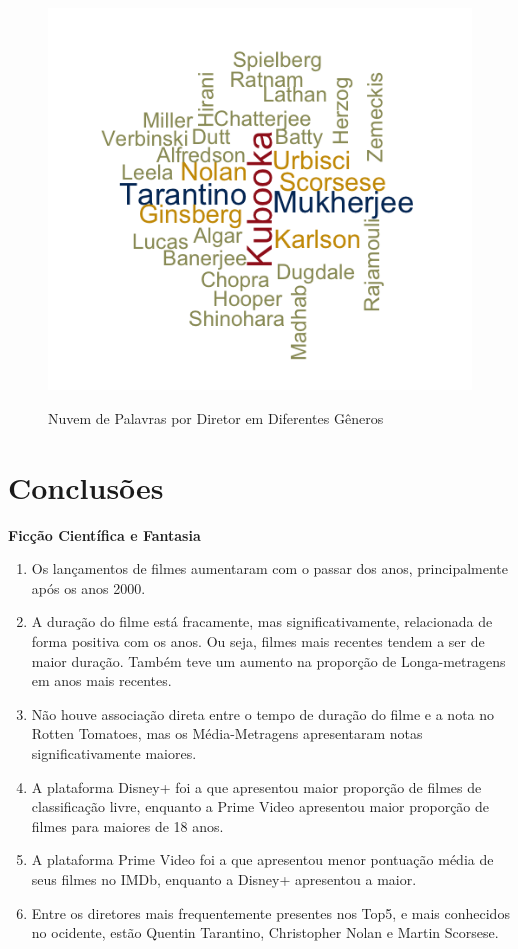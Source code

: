 \documentclass[a4paper, 12pt]{article} %
\begin{document}
\begin{figure}[H]
    \centering
    \caption{Nuvem de Palavras por Diretor em Diferentes Gêneros}
    \includegraphics[scale=1]{Nuvem.png}
    \label{fig:my_label}
\end{figure}

\pagebreak

\section{Conclusões}
\textbf{Ficção Científica e Fantasia}
\begin{enumerate}[topsep=0pt,partopsep=0pt]
    \item Os lançamentos de filmes aumentaram com o passar dos anos, principalmente após os anos 2000.
    \item A duração do filme está fracamente, mas significativamente, relacionada de forma positiva com os anos. Ou seja, filmes mais recentes tendem a ser de maior duração. Também teve um aumento na proporção de Longa-metragens em anos mais recentes. 
    \item Não houve associação direta entre o tempo de duração do filme e a nota no Rotten Tomatoes, mas os Média-Metragens apresentaram notas significativamente maiores. 
    \item A plataforma Disney+ foi a que apresentou maior proporção de filmes de classificação livre, enquanto a Prime Video apresentou maior proporção de filmes para maiores de 18 anos. 
    \item A plataforma Prime Video foi a que apresentou menor pontuação média de seus filmes no IMDb, enquanto a Disney+ apresentou a maior. 
    \item Entre os diretores mais frequentemente presentes nos Top5, e mais conhecidos no ocidente, estão Quentin Tarantino, Christopher Nolan e Martin Scorsese.
\end{enumerate}
\end{document}
